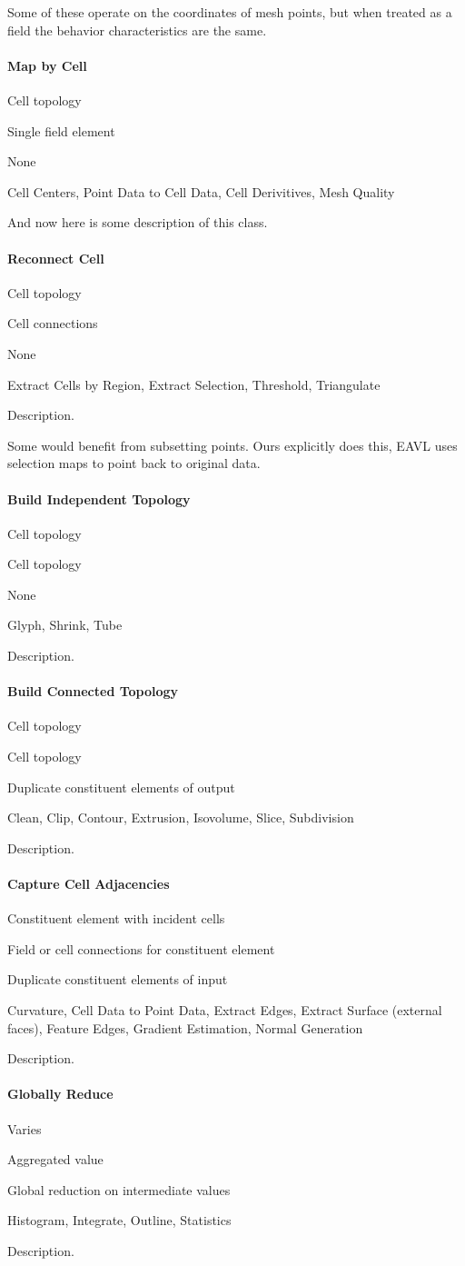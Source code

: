 \documentclass{sig-alternate}
\newcommand{\algorithmclasssection}[1]{\paragraph{#1}}
\newcommand{\algorithmclass}[5]{
  \algorithmclasssection{#1} %
  \begin{description}[leftmargin=4.5em,style=nextline,noitemsep]
  \item[Input] #2
  \item[Output] #3
  \item[Overlap] #4
  \item[Algorithms] #5
  \end{description}
}
\begin{document}
\noindent
Some of these operate on the coordinates of mesh points, but when treated
as a field the behavior characteristics are the same.


\algorithmclass{Map by Cell}
               {Cell topology} %
               {Single field element} %
               {None} %
               {Cell Centers, Point Data to Cell Data, Cell Derivitives,
                 Mesh Quality}

\noindent
And now here is some description of this class.


\algorithmclass{Reconnect Cell}
               {Cell topology} %
               {Cell connections} %
               {None} %
               {Extract Cells by Region, Extract Selection, Threshold,
                 Triangulate}

\noindent
Description.

Some would benefit from subsetting points. Ours explicitly does this, EAVL
uses selection maps to point back to original data.


\algorithmclass{Build Independent Topology}
               {Cell topology} %
               {Cell topology} %
               {None} %
               {Glyph, Shrink, Tube}

\noindent
Description.


\algorithmclass{Build Connected Topology}
               {Cell topology} %
               {Cell topology} %
               {Duplicate constituent elements of output} %
               {Clean, Clip, Contour, Extrusion, Isovolume, Slice, Subdivision}

\noindent
Description.


\algorithmclass{Capture Cell Adjacencies}
               {Constituent element with incident cells} %
               {Field or cell connections for constituent element} %
               {Duplicate constituent elements of input} %
               {Curvature, Cell Data to Point Data, Extract Edges, Extract
                 Surface (external faces), Feature Edges, Gradient
                 Estimation, Normal Generation}

\noindent
Description.


\algorithmclass{Globally Reduce}
               {Varies} %
               {Aggregated value} %
               {Global reduction on intermediate values} %
               {Histogram, Integrate, Outline, Statistics}

\noindent
Description.
\end{document}

